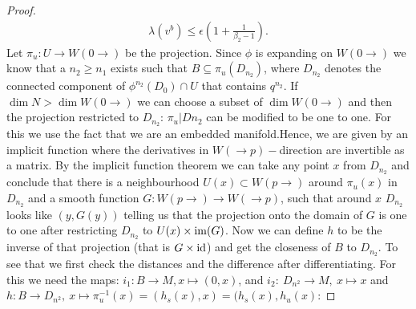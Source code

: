 \begin{proof}
\begin{align*}
			\lambda(v^b)\leq \epsilon(1+\frac{1}{\beta_2-1}).
		\end{align*}
		Let $\pi_u:U \to W(0\to)$ be the projection. Since $\phi$ is expanding on $W(0 \to)$ we know that a $n_2\geq n_1$ exists such that $B\subseteq \pi_u(D_{n_2})$, where $D_{n_2}$ denotes the connected component of $\phi^{n_2}(D_0)\cap U$ that contains $q^{n_2}$. If $\dim N > \dim W(0 \to)$ we can choose a subset of $\dim W(0\to)$ and then the projection restricted to $D_{n_2}$:  $\pi_u|{D{n_2}}$ can be modified to be one to one. For this we use the fact that we are an embedded manifold.Hence, we are given by an implicit function where the derivatives in $W(\to p)-$direction are invertible as a matrix. By the implicit function theorem we can take any point $x$ from $D_{n_2}$ and conclude that there is a neighbourhood $U(x)\subset W(p\to)$ around $\pi_u(x)$ in $D_{n_2}$ and a smooth function $G: W(p\to)\to W(\to p)$, such that around $x$ $D_{n_2}$ looks like $(y,G(y))$ telling us that the projection onto the domain of $G$ is one to one after restricting $D_{n_2}$ to $U(x)\times \mathrm{im}(G)$. Now we can define $h$ to be the inverse of that projection (that is $G\times \operatorname{\text{id}}$) and get the closeness of $B$ to $D_{n_2}$. To see that we first check the distances and the difference after differentiating. For this we need the maps: $i_1:B\to M, x \mapsto (0,x)$, and $i_2: ~D_{n^2} \to M,~ x\mapsto x$ and $h: B \to D_{n^2},~ x \mapsto \pi_u^{-1}(x)=(h_s(x),x)=(h_s(x),h_u(x)$:
		

\end{proof}
